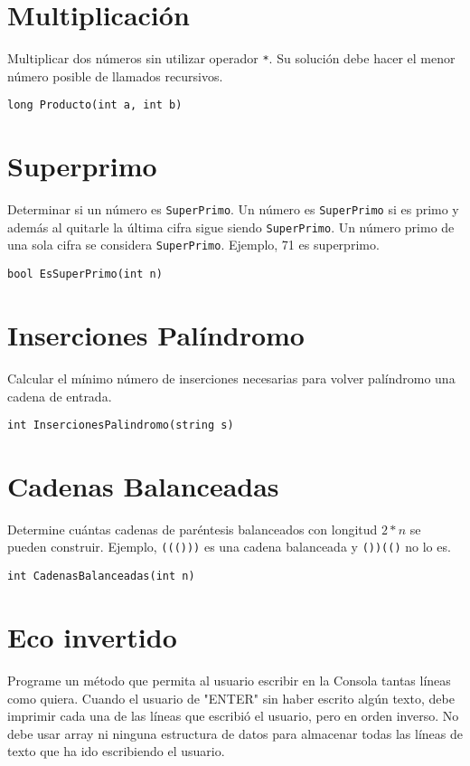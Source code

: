 \section{Multiplicación}
Multiplicar dos números sin utilizar operador \texttt{*}. Su solución debe hacer el menor número posible de llamados recursivos.

\begin{verbatim}
long Producto(int a, int b)
\end{verbatim}

\section{Superprimo}
Determinar si un número es \texttt{SuperPrimo}. Un número es \texttt{SuperPrimo} si es primo y además al quitarle la última cifra sigue siendo \texttt{SuperPrimo}. Un número primo de una sola cifra se considera \texttt{SuperPrimo}. Ejemplo, 71 es superprimo.

\begin{verbatim}
bool EsSuperPrimo(int n)
\end{verbatim}

\section{Inserciones Palíndromo}
Calcular el mínimo número de inserciones necesarias para volver palíndromo una cadena de entrada.

\begin{verbatim}
int InsercionesPalindromo(string s)
\end{verbatim}

\section{Cadenas Balanceadas}
Determine cuántas cadenas de paréntesis balanceados con longitud $2 * n$ se pueden construir. Ejemplo, \texttt{((()))} es una cadena balanceada y \texttt{())(()} no lo es.

\begin{verbatim}
int CadenasBalanceadas(int n)
\end{verbatim}

\section{Eco invertido}
Programe un método que permita al usuario escribir en la Consola tantas líneas como quiera. Cuando el usuario de "ENTER" sin haber escrito algún texto, debe imprimir cada una de las líneas que escribió el usuario, pero en orden inverso. No debe usar array ni ninguna estructura de datos para almacenar todas las líneas de texto que ha ido escribiendo el usuario.

